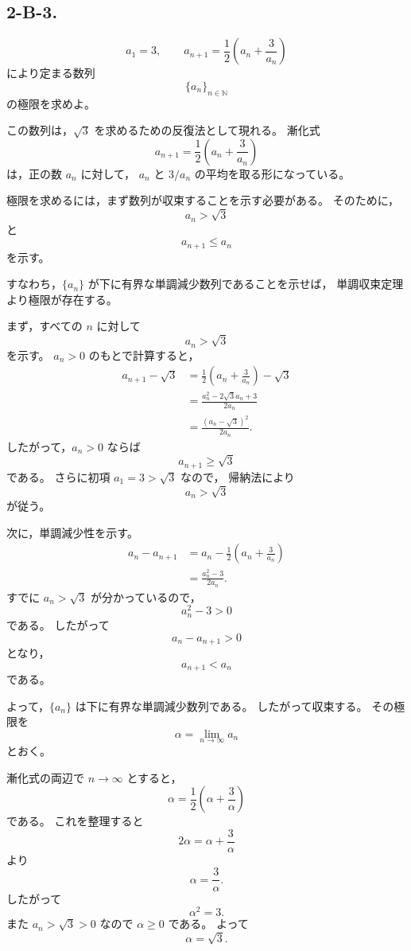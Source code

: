 \subsection{2-B-3.}
\begin{exercise}
	\[
	a_1=3,
	\qquad
	a_{n+1}
	=
	\frac{1}{2}
	\left(
	a_n+\frac{3}{a_n}
	\right)
	\]
	により定まる数列
	\[
	\{a_n\}_{n\in\mathbb{N}}
	\]
	の極限を求めよ。
\end{exercise}

\begin{background}
	この数列は，\(\sqrt{3}\) を求めるための反復法として現れる。
	漸化式
	\[
	a_{n+1}
	=
	\frac{1}{2}
	\left(
	a_n+\frac{3}{a_n}
	\right)
	\]
	は，正の数 \(a_n\) に対して，
	\(a_n\) と \(3/a_n\) の平均を取る形になっている。
	
	極限を求めるには，まず数列が収束することを示す必要がある。
	そのために，
	\[
	a_n>\sqrt{3}
	\]
	と
	\[
	a_{n+1}\leq a_n
	\]
	を示す。
	
	すなわち，\(\{a_n\}\) が下に有界な単調減少数列であることを示せば，
	単調収束定理より極限が存在する。
\end{background}

\begin{strategy}
	まず，すべての \(n\) に対して
	\[
	a_n>\sqrt{3}
	\]
	を示す。
	\(a_n>0\) のもとで計算すると，
	\[
	\begin{aligned}
		a_{n+1}-\sqrt{3}
		&=
		\frac{1}{2}
		\left(
		a_n+\frac{3}{a_n}
		\right)
		-\sqrt{3} \\
		&=
		\frac{a_n^2-2\sqrt{3}a_n+3}{2a_n} \\
		&=
		\frac{(a_n-\sqrt{3})^2}{2a_n}.
	\end{aligned}
	\]
	したがって，\(a_n>0\) ならば
	\[
	a_{n+1}\geq\sqrt{3}
	\]
	である。
	さらに初項 \(a_1=3>\sqrt{3}\) なので，
	帰納法により
	\[
	a_n>\sqrt{3}
	\]
	が従う。
	
	次に，単調減少性を示す。
	\[
	\begin{aligned}
		a_n-a_{n+1}
		&=
		a_n-
		\frac{1}{2}
		\left(
		a_n+\frac{3}{a_n}
		\right) \\
		&=
		\frac{a_n^2-3}{2a_n}.
	\end{aligned}
	\]
	すでに \(a_n>\sqrt{3}\) が分かっているので，
	\[
	a_n^2-3>0
	\]
	である。
	したがって
	\[
	a_n-a_{n+1}>0
	\]
	となり，
	\[
	a_{n+1}<a_n
	\]
	である。
	
	よって，\(\{a_n\}\) は下に有界な単調減少数列である。
	したがって収束する。
	その極限を
	\[
	\alpha=\lim_{n\to\infty}a_n
	\]
	とおく。
	
	漸化式の両辺で \(n\to\infty\) とすると，
	\[
	\alpha
	=
	\frac{1}{2}
	\left(
	\alpha+\frac{3}{\alpha}
	\right)
	\]
	である。
	これを整理すると
	\[
	2\alpha=\alpha+\frac{3}{\alpha}
	\]
	より
	\[
	\alpha=\frac{3}{\alpha}.
	\]
	したがって
	\[
	\alpha^2=3.
	\]
	また \(a_n>\sqrt{3}>0\) なので \(\alpha\geq0\) である。
	よって
	\[
	\alpha=\sqrt{3}.
	\]
\end{strategy}